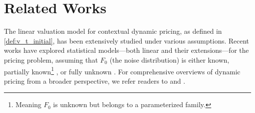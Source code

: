 \section{Related Works}
\label{sec:related}
The linear valuation model for contextual dynamic pricing, as defined in \cref{def:v_t_initial}, has been extensively studied under various assumptions. Recent works have explored statistical models—both linear and their extensions—for the pricing problem, assuming that $F_0$ (the noise distribution) is either known, partially known\footnote{Meaning $F_0$ is unknown but belongs to a parameterized family.} \citep{miao2019context, ban2021personalized, javanmard2019dynamic, golrezaei2019dynamic}, or fully unknown \citep{fan2021policy, xu2022towards, luo2022contextual}. For comprehensive overviews of dynamic pricing from a broader perspective, we refer readers to \cite{den2015dynamic} and \cite{kumar2018research}.

